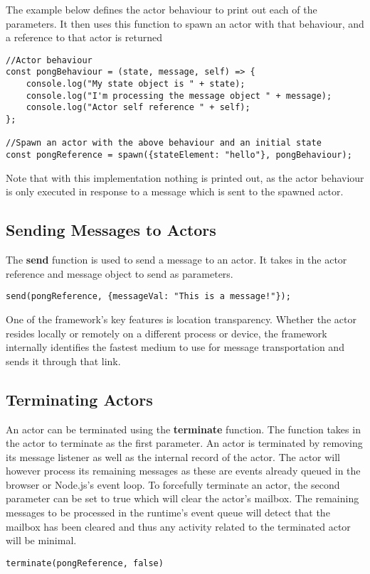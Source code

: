 \documentclass[12pt, a4paper]{report}
\theoremstyle{definition}
\theoremstyle{definition}%
\theoremstyle{definition}%
\theoremstyle{definition}%
\theoremstyle{definition}%
\theoremstyle{definition}%
\begin{document}
The example below defines the actor behaviour to print out each of the parameters. It then uses this function to spawn an actor with that behaviour, and a reference to that actor is returned
\begin{lstlisting}
//Actor behaviour
const pongBehaviour = (state, message, self) => {
    console.log("My state object is " + state);
    console.log("I'm processing the message object " + message);
    console.log("Actor self reference " + self);
};

//Spawn an actor with the above behaviour and an initial state
const pongReference = spawn({stateElement: "hello"}, pongBehaviour);
\end{lstlisting}
Note that with this implementation nothing is printed out, as the actor behaviour is only executed in response to a message which is sent to the spawned actor.
\subsection{Sending Messages to Actors}
The \textbf{send} function is used to send a message to an actor. It takes in the actor reference and message object to send as parameters.
\begin{lstlisting}
send(pongReference, {messageVal: "This is a message!"});
\end{lstlisting}
One of the framework's key features is location transparency. Whether the actor resides locally or remotely on a different process or device, the framework internally identifies the fastest medium to use for message transportation and sends it through that link.
\subsection{Terminating Actors}
An actor can be terminated using the \textbf{terminate} function. The function takes in the actor to terminate as the first parameter. An actor is terminated by removing its message listener as well as the internal record of the actor. The actor will however process its remaining messages as these are events already queued in the browser or Node.js's event loop. To forcefully terminate an actor, the second parameter can be set to true which will clear the actor's mailbox. The remaining messages to be processed in the runtime's event queue will detect that the mailbox has been cleared and thus any activity related to the terminated actor will be minimal.
\begin{lstlisting}
terminate(pongReference, false)
\end{lstlisting}
\end{document}
